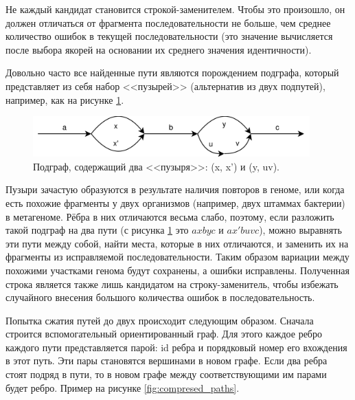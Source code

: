 \documentclass[14pt]{matmex-diploma-custom}
\begin{document}
Не каждый кандидат становится строкой-заменителем. Чтобы это произошло, он должен отличаться от фрагмента последовательности не больше, чем среднее количество ошибок в текущей последовательности (это значение вычисляется после выбора якорей на основании их среднего значения идентичности).

Довольно часто все найденные пути являются порождением подграфа, который представляет из себя набор <<пузырей>> (альтернатив из двух подпутей), например, как на рисунке \ref{fig:buldges}. 

\begin{figure}[h]
    \centering
    \includegraphics[width=0.95\textwidth]{buldges.png}
    \caption{Подграф, содержащий два <<пузыря>>: (x, x') и (y, uv).}
    \label{fig:buldges}
\end{figure}

Пузыри зачастую образуются в результате наличия повторов в геноме, или когда есть похожие фрагменты у двух организмов (например, двух штаммах бактерии) в метагеноме. Рёбра в них отличаются весьма слабо, поэтому, если разложить такой подграф на два пути (с рисунка \ref{fig:buldges} это $axbyc$ и $ax'buvc$), можно выравнять эти пути между собой, найти места, которые в них отличаются, и заменить их на фрагменты из исправляемой последовательности. Таким образом вариации между похожими участками генома будут сохранены, а ошибки исправлены. Полученная строка является также лишь кандидатом на строку-заменитель, чтобы избежать случайного внесения большого количества ошибок в последовательность.

Попытка сжатия путей до двух происходит следующим образом.  Сначала строится вспомогательный ориентированный граф. Для этого каждое ребро каждого пути представляется парой: id ребра и порядковый номер его вхождения в этот путь. Эти пары становятся вершинами в новом графе. Если два ребра стоят подряд в пути, то в новом графе между соответствующими им парами будет ребро. Пример на рисунке \ref{fig:compresed_paths}.
\end{document}
